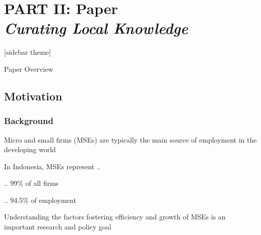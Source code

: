 \documentclass[hideothersubsections, usenames,dvipsnames,11pt]{beamer}
\newenvironment{itemize_2pt}{\itemize\addtolength{\itemsep}{2pt}}{\enditemize}
\begin{document}
\author[]
{Patricio S. Dalton\
Julius R{\"u}schenp{\"o}hler
Burak Uras\inst{1}\\and
Bilal Zia}


\date{March 04, 2021}


\section{\textbf{PART II: Paper} \\ \quad \emph{Curating Local Knowledge}}


\begin{frame}
\titlepage
\end{frame}


\setbeamertemplate{sidebar right}[sidebar theme]

\begin{frame}{Paper Overview}
\end{frame}


\subsection{Motivation}

\begin{frame}
\frametitle{Background}
	\begin{itemize_2pt}
	\item Micro and small firms (MSEs) are typically the main \textcolor{bdf}{source of employment} in the developing world
	\item In \textcolor{bdf}{Indonesia}, MSEs represent .. 
	\begin{itemize_2pt}
		\item .. 99\% of all firms
		\item .. 94.5\% of employment
	\end{itemize_2pt} 
	\item Understanding the factors fostering efficiency and growth of MSEs is an important research and policy goal
	\end{itemize_2pt}
\end{frame}
\end{document}
